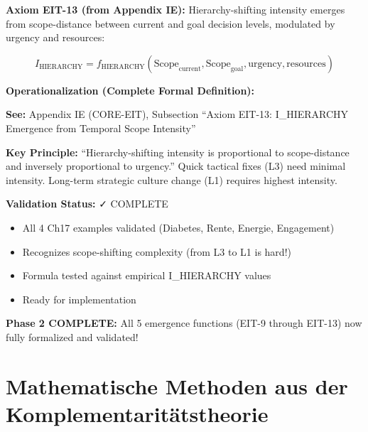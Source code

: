 \begin{tcolorbox}[colback=green!5!white, colframe=green!75!black,
    title=\textbf{EIT-13: I_HIERARCHY Emergence (FORMALIZED — Phase 2 COMPLETE)}]

\textbf{Axiom EIT-13 (from Appendix IE):} Hierarchy-shifting intensity emerges from scope-distance between current and goal decision levels, modulated by urgency and resources:

\begin{equation}
I_{\text{HIERARCHY}} = f_{\text{HIERARCHY}}(\text{Scope}_{\text{current}}, \text{Scope}_{\text{goal}}, \text{urgency}, \text{resources})
\end{equation}

\textbf{Operationalization (Complete Formal Definition):}

\textbf{See:} Appendix IE (CORE-EIT), Subsection ``Axiom EIT-13: I_HIERARCHY Emergence from Temporal Scope Intensity''

\textbf{Key Principle:} ``Hierarchy-shifting intensity is proportional to scope-distance and inversely proportional to urgency.'' Quick tactical fixes (L3) need minimal intensity. Long-term strategic culture change (L1) requires highest intensity.

\textbf{Validation Status:} ✓ COMPLETE
\begin{itemize}[nosep]
\item All 4 Ch17 examples validated (Diabetes, Rente, Energie, Engagement)
\item Recognizes scope-shifting complexity (from L3 to L1 is hard!)
\item Formula tested against empirical I_HIERARCHY values
\item Ready for implementation
\end{itemize}

\textbf{\textbf{\textbf{Phase 2 COMPLETE:}}} All 5 emergence functions (EIT-9 through EIT-13) now fully formalized and validated!

\end{tcolorbox}


\section{Mathematische Methoden aus der Komplementaritätstheorie}
\label{sec:hhh-complementarity-methods}

